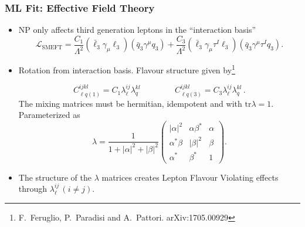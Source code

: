 \documentclass[mathserif, 10pt]{beamer}
\begin{document}
\begin{frame}\frametitle{ML Fit: Effective Field Theory}
    \begin{itemize}
        \item NP only affects third generation leptons in the ``interaction basis''
              $$\mathcal{L}_\mathrm{SMEFT} = \frac{C_1}{\Lambda^2}(\bar{\ell}_3 \gamma_\mu \ell_3)(\bar{q}_3 \gamma^\mu  q_3) + \frac{C_3}{\Lambda^2}(\bar{\ell}_3 \gamma_\mu \tau^I \ell_3)(\bar{q}_3 \gamma^\mu \tau^I q_3).$$
        \item Rotation from interaction basis. Flavour structure given by\footnote[12]{F.~Feruglio, P.~Paradisi and A.~Pattori. arXiv:1705.00929}

              $$C_{\ell q(1)}^{ijkl} = C_1 \lambda_\ell^{ij}\lambda_q^{kl}\,\qquad\qquad C_{\ell q(3)}^{ijkl} = C_3 \lambda_\ell^{ij}\lambda_q^{kl}\,. $$
              The mixing matrices must be hermitian, idempotent and with $\mathrm{tr}\lambda =1$. Parameterized as
              $$ \lambda = \frac{1}{1+|\alpha|^2+|\beta|^2}\begin{pmatrix}
                      |\alpha|^2 & \alpha \beta^* & \alpha \\ \alpha^* \beta & |\beta|^2 & \beta \\ \alpha^* & \beta^* & 1
                  \end{pmatrix}. $$
        \item The structure of the $\lambda$ matrices creates Lepton Flavour Violating effects through $\lambda_\ell^{ij}\, (i\neq j)$.
    \end{itemize}
\end{frame}
\end{document}
